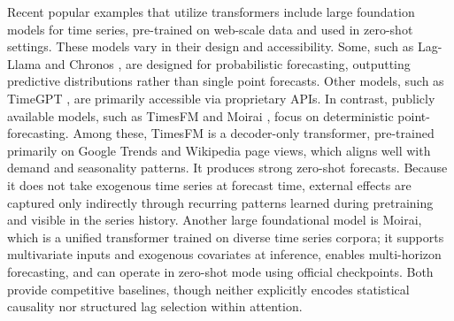 \documentclass[acmsmall]{acmart}
\begin{document}
{\color{black}Recent popular examples that utilize transformers include large foundation models for time series, pre-trained on web-scale data and used in zero-shot settings. These models vary in their design and accessibility. Some, such as Lag-Llama \cite{rasul2023lag} and Chronos \cite{ansari2024chronos}, are designed for probabilistic forecasting, outputting predictive distributions rather than single point forecasts. Other models, such as TimeGPT \cite{garza2023timegpt}, are primarily accessible via proprietary APIs. In contrast, publicly available models, such as TimesFM \cite{das2024decoder} and Moirai \cite{woo2024unified}, focus on deterministic point-forecasting. Among these, TimesFM is a decoder-only transformer, pre-trained primarily on Google Trends and Wikipedia page views, which aligns well with demand and seasonality patterns. It produces strong zero-shot forecasts. Because it does not take exogenous time series at forecast time, external effects are captured only indirectly through recurring patterns learned during pretraining and visible in the series history. Another large foundational model is Moirai, which is a unified transformer trained on diverse time series corpora; it supports multivariate inputs and exogenous covariates at inference, enables multi-horizon forecasting, and can operate in zero-shot mode using official checkpoints. Both provide competitive baselines, though neither explicitly encodes statistical causality nor structured lag selection within attention.}
\end{document}
